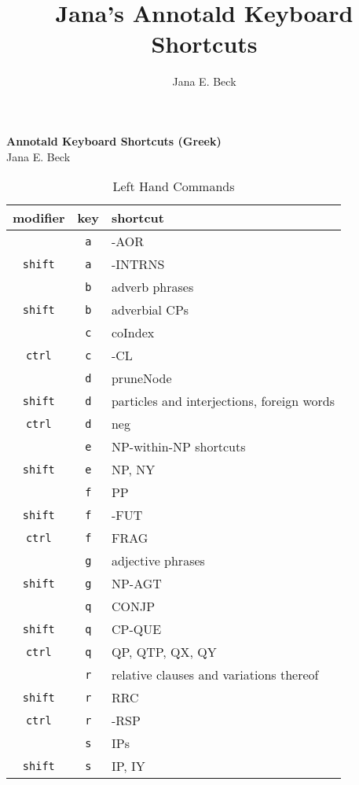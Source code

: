 \documentclass[10pt]{article}
\title{Jana's Annotald Keyboard Shortcuts}
\author{Jana E. Beck}
\begin{document}
\begin{center}
\Large{\textbf{Annotald Keyboard Shortcuts (Greek)}}\\
Jana E. Beck
\end{center}

\begin{table}[ht]
\caption{Left Hand Commands}
\begin{center}
\begin{tabular}{c c l}
\hline
modifier & key & shortcut\\
\hline
\hline
& \texttt{a} & -AOR\\
\texttt{shift} & \texttt{a} & -INTRNS\\
\hline
& \texttt{b} & adverb phrases\\
\texttt{shift} & \texttt{b} & adverbial CPs\\
\hline
& \texttt{c} & coIndex\\
\texttt{ctrl} & \texttt{c} & -CL\\
\hline
& \texttt{d} & pruneNode\\
\texttt{shift} & \texttt{d} & particles and interjections, foreign words\\
\texttt{ctrl} & \texttt{d} & neg\\
\hline
& \texttt{e} & NP-within-NP shortcuts\\
\texttt{shift} & \texttt{e} & NP, NY\\
\hline
& \texttt{f} & PP\\
\texttt{shift} & \texttt{f} & -FUT\\
\texttt{ctrl} & \texttt{f} & FRAG\\
\hline
& \texttt{g} & adjective phrases\\
\texttt{shift} & \texttt{g} & NP-AGT\\
\hline
& \texttt{q} & CONJP\\
\texttt{shift} & \texttt{q} & CP-QUE\\
\texttt{ctrl} & \texttt{q} & QP, QTP, QX, QY\\
\hline
& \texttt{r} & relative clauses and variations thereof\\
\texttt{shift} & \texttt{r} & RRC\\
\texttt{ctrl} & \texttt{r} & -RSP\\
\hline
& \texttt{s} & IPs\\
\texttt{shift} & \texttt{s} & IP, IY\\

\end{tabular}
\end{center}
\end{table}
\end{document}
